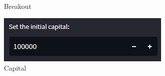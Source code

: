 \begin{figure}[ht]
\begin{minipage}[b]{0.4\textwidth}
        \caption{Breakout}
        \label{fig:image2}
    \end{minipage}
    \hfill
    \begin{minipage}[b]{0.4\textwidth}
        \includegraphics[width=\textwidth]{Images/capital.png}
        \caption{Capital}
        \label{fig:image2}
    \end{minipage}
    \label{fig:bothimages}
\end{figure}
